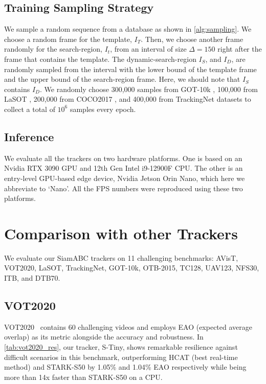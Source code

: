   \subsection{Training Sampling Strategy} \label{sec:methods_sampling}
  
  We sample a random sequence from a database as shown in \ref{alg:sampling}. We choose a random frame for the template, $I_T$. Then, we choose another frame randomly for the search-region, $I_t$, from an interval of size $\Delta=150$ right after the frame that contains the template. The dynamic-search-region $I_S$, and $I_D$, are randomly sampled from the interval with the lower bound of the template frame and the upper bound of the search-region frame. Here, we should note that $I_S$ contains $I_D$. We randomly choose 300,000 samples from GOT-10k \cite{Huang2021}, 100,000 from LaSOT \cite{fan2021lasot}, 200,000 from COCO2017 \cite{lin2014microsoft}, and 400,000 from TrackingNet \cite{muller2018trackingnet} datasets to collect a total of $10^6$ samples every epoch.

  \subsection{Inference}
  We evaluate all the trackers on two hardware platforms. One is based on an Nvidia RTX 3090 GPU and 12th Gen Intel i9-12900F CPU. The other is an entry-level GPU-based edge device, Nvidia Jetson Orin Nano, which here we abbreviate to `Nano'. All the FPS numbers were reproduced using these two platforms. 
  
  \section{Comparison with other Trackers} \label{sec:benchmarks}
  We evaluate our SiamABC trackers on 11 challenging benchmarks: AVisT\cite{noman2022avist}, VOT2020\cite{kristan2020eighth}, LaSOT\cite{fan2021lasot}, TrackingNet\cite{muller2018trackingnet}, GOT-10k\cite{Huang2021}, OTB-2015\cite{7001050}, TC128\cite{liang2015encoding}, UAV123\cite{mueller2016benchmark}, NFS30\cite{kiani2017need}, ITB\cite{li2021informative}, and DTB70\cite{drone-tracking}. 
  
  
  \subsection{VOT2020}  
  VOT2020~\cite{kristan2020eighth} contains 60 challenging videos and employs EAO (expected average overlap) as its metric alongside the accuracy and robustness. In \ref{tab:vot2020_res}, our tracker, S-Tiny, shows remarkable resilience against difficult scenarios in this benchmark, outperforming HCAT\cite{chen2022efficient} (best real-time method) and STARK-S50\cite{yan2021learning} by 1.05\% and 1.04\% EAO respectively while being more than 14x faster than STARK-S50 on a CPU.
  
